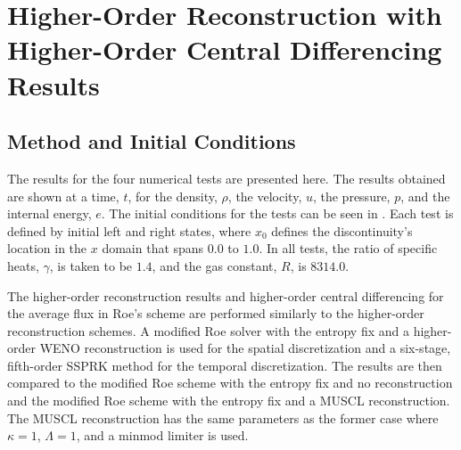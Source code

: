 \chapter{Higher-Order Reconstruction with Higher-Order Central Differencing Results}
\section{Method and Initial Conditions}
The results for the four numerical tests are presented here. The results obtained are shown at a time, $t$, for the density, $\rho$, the velocity, $u$, the pressure, $p$, and the internal energy, $e$. The initial conditions for the tests can be seen in . Each test is defined by initial left and right states, where $x_0$ defines the discontinuity's location in the $x$ domain that spans $0.0$ to $1.0$. In all tests, the ratio of specific heats, $\gamma$, is taken to be $1.4$, and the gas constant, $R$, is $8314.0$.

The higher-order reconstruction results and higher-order central differencing for the average flux in Roe's scheme are performed similarly to the higher-order reconstruction schemes. A modified Roe solver with the entropy fix and a higher-order WENO reconstruction is used for the spatial discretization and a six-stage, fifth-order SSPRK method for the temporal discretization. The results are then compared to the modified Roe scheme with the entropy fix and no reconstruction and the modified Roe scheme with the entropy fix and a MUSCL reconstruction. The MUSCL reconstruction has the same parameters as the former case where $\kappa = 1$, $\Lambda = 1$, and a minmod limiter is used.
